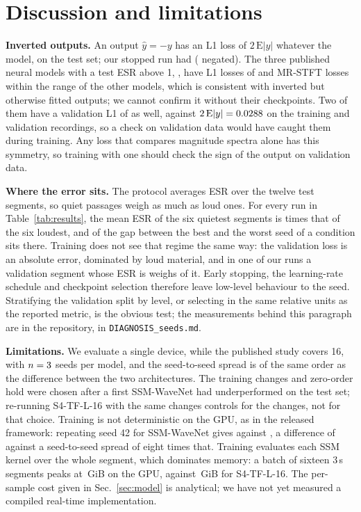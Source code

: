 \documentclass{article}
\begin{document}
\section{Discussion and limitations}
\label{sec:discussion}

\textbf{Inverted outputs.} An output $\hat{y} = -y$ has an L1 loss of
$2\,\mathrm{E}|y|$ whatever the model, \TwiceMeanAbsTarget{} on the test set; our
stopped run had \InvertedLone{} (\InvertedNegatedLone{} negated). The three
published neural models with a test ESR above 1, \PubOutliers, have L1 losses of
\PubOutlierLoneRange{} and MR-STFT losses within the range of the other models,
which is consistent with inverted but otherwise fitted outputs; we cannot
confirm it without their checkpoints. Two of them have a validation L1 of
\PubOutlierValLone{} as well, against $2\,\mathrm{E}|y| = 0.0288$
on the training and validation recordings, so a check on validation data would
have caught them during training. Any loss that compares magnitude spectra
alone has this symmetry, so training with one should check the sign of the
output on validation data.

\textbf{Where the error sits.} The protocol averages ESR over the twelve test
segments, so quiet passages weigh as much as loud ones. For every run in
Table~\ref{tab:results}, the mean ESR of the six quietest segments is
\QuietLoudRatioRange{} times that of the six loudest, and \SpreadQuietShare{} of
the gap between the best and the worst seed of a condition sits there. Training
does not see that regime the same way: the validation loss is an absolute error,
dominated by loud material, and in one of our runs a validation segment whose
ESR is \ValBlindEsr{} weighs \ValBlindShare{} of it. Early stopping, the
learning-rate schedule and checkpoint selection therefore leave low-level
behaviour to the seed. Stratifying the validation split by level, or selecting
in the same relative units as the reported metric, is the obvious test; the
measurements behind this paragraph are in the repository, in
\texttt{DIAGNOSIS\_seeds.md}.

\textbf{Limitations.} We evaluate a single device, while the published study
covers 16, with $n=3$ seeds per model, and the seed-to-seed spread is of the
same order as the difference between the two architectures. The training changes and zero-order hold were
chosen after a first SSM-WaveNet had underperformed on the test set; re-running
S4-TF-L-16 with the same changes controls for the changes, not for that choice.
Training is not deterministic on the GPU, as in the released framework:
repeating seed 42 for SSM-WaveNet gives \RepeatEsr{} against \SSMesrMin{}, a
difference of \RepeatDelta{} against a seed-to-seed spread of eight times that.
Training evaluates each SSM kernel over the whole segment, which dominates
memory: a batch of sixteen 3\,s segments peaks at \SSMpeakGiB\,GiB on the GPU,
against \SFourTFLpeakGiB\,GiB for S4-TF-L-16. The per-sample cost given in
Sec.~\ref{sec:model} is analytical; we have not yet measured a compiled
real-time implementation.
\end{document}
